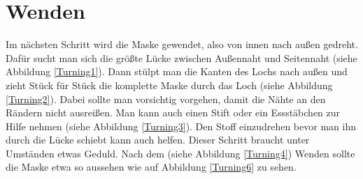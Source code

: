 \documentclass[12pt,parskip=full]{scrartcl}
\begin{document}
\section{Wenden}
Im nächsten Schritt wird die Maske gewendet, also von innen nach außen gedreht. Dafür sucht man sich die größte Lücke zwischen Außennaht und Seitennaht (siehe Abbildung \ref{Turning1}). Dann stülpt man die Kanten des Lochs nach außen und zieht Stück für Stück die komplette Maske durch das Loch (siehe Abbildung \ref{Turning2}). Dabei sollte man vorsichtig vorgehen, damit die Nähte an den Rändern nicht ausreißen. Man kann auch einen Stift oder ein Essstäbchen zur Hilfe nehmen (siehe Abbildung \ref{Turning3}). Den Stoff einzudrehen bevor man ihn durch die Lücke schiebt kann auch helfen. Dieser Schritt braucht unter Umständen etwas Geduld. Nach dem (siehe Abbildung \ref{Turning4}) Wenden sollte die Maske etwa so aussehen wie auf Abbildung \ref{Turning6} zu sehen.
\end{document}

